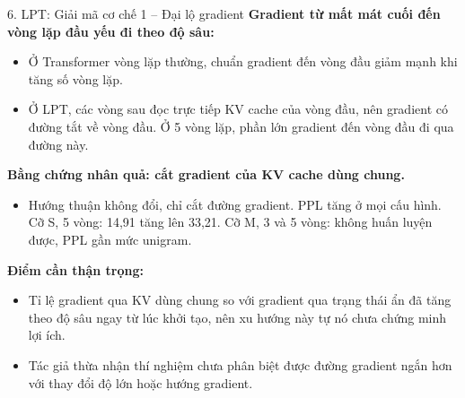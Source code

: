 \begin{frame}{6. LPT: Giải mã cơ chế 1 -- Đại lộ gradient}
    \small
    \textbf{Gradient từ mất mát cuối đến vòng lặp đầu yếu đi theo độ sâu:}
    \begin{itemize}
        \item Ở Transformer vòng lặp thường, chuẩn gradient đến vòng đầu giảm mạnh khi tăng số vòng lặp.
        \item Ở LPT, các vòng sau đọc trực tiếp KV cache của vòng đầu, nên gradient có đường tắt về vòng đầu. Ở 5 vòng lặp, phần lớn gradient đến vòng đầu đi qua đường này.
    \end{itemize}
    \vspace{0.1cm}
    \textbf{Bằng chứng nhân quả: cắt gradient của KV cache dùng chung.}
    \begin{itemize}
        \item Hướng thuận không đổi, chỉ cắt đường gradient. PPL tăng ở mọi cấu hình. Cỡ S, 5 vòng: 14,91 tăng lên 33,21. Cỡ M, 3 và 5 vòng: không huấn luyện được, PPL gần mức unigram.
    \end{itemize}
    \vspace{0.1cm}
    \textbf{Điểm cần thận trọng:}
    \begin{itemize}
        \item Tỉ lệ gradient qua KV dùng chung so với gradient qua trạng thái ẩn đã tăng theo độ sâu ngay từ lúc khởi tạo, nên xu hướng này tự nó chưa chứng minh lợi ích.
        \item Tác giả thừa nhận thí nghiệm chưa phân biệt được đường gradient ngắn hơn với thay đổi độ lớn hoặc hướng gradient.
    \end{itemize}
\end{frame}

